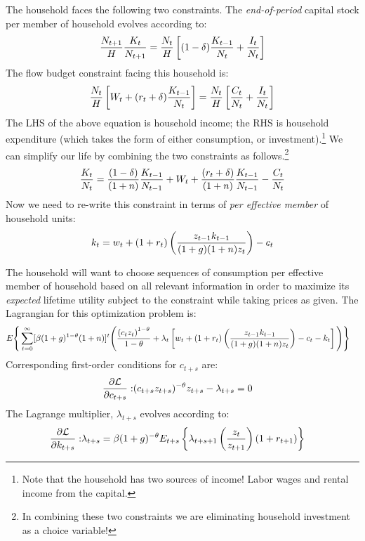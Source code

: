 \documentclass[11pt]{article}
\begin{document}
The household faces the following two constraints.  The \textit{end-of-period} capital stock per member of household evolves according to:
	\begin{equation}\label{eq:motionCapital}
		\frac{N_{t+1}}{H}\frac{K_t}{N_{t+1}} = \frac{N_t}{H}\left[(1 - \delta)\frac{K_{t-1}}{N_t} + \frac{I_{t}}{N_t}\right] \notag
	\end{equation}
The flow budget constraint facing this household is:
	\begin{equation}\label{eq:HHflowBudgetConstraint}
		\frac{N_{t}}{H}\left[W_{t} + (r_{t} + \delta)\frac{K_{t-1}}{N_t}\right] = \frac{N_{t}}{H}\left[\frac{C_{t}}{N_{t}} + \frac{I_{t}}{N_{t}}\right] \notag 
	\end{equation}
The LHS of the above equation is household income; the RHS is household expenditure (which takes the form of either consumption, or investment).\footnote{Note that the household has two sources of income! Labor wages and rental income from the capital.} We can simplify our life by combining the two constraints as follows.\footnote{In combining these two constraints we are eliminating household investment as a choice variable!}
	\begin{equation}
		\frac{K_t}{N_t} = \frac{(1 - \delta)}{(1 + n)}\frac{K_{t-1}}{N_{t-1}} + W_{t} + \frac{(r_{t} + \delta)}{(1+n)}\frac{K_{t-1}}{N_{t-1}} -  \frac{C_{t}}{N_{t}}\notag
	\end{equation}
Now we need to re-write this constraint in terms of \textit{per effective member} of household units:
	\begin{align}
		k_t= w_t + (1 + r_t)\left(\frac{z_{t-1}k_{t-1}}{(1 + g)(1 + n)z_t}\right) - c_t\notag
	\end{align}
	
The household will want to choose sequences of  consumption per effective member of household based on all relevant information in order to maximize its \textit{expected} lifetime utility subject to the constraint while taking prices as given.  The Lagrangian for this optimization problem is:
	\begin{align}
		&E\Bigg\{\sum_{t=0}^{\infty} [\beta(1+g)^{1-\theta}(1+n)]^t\Bigg(\frac{\left(c_t z_t\right)^{1-\theta}}{1-\theta} + \lambda_{t} \left[w_t + (1 + r_t)\left(\frac{z_{t-1}k_{t-1}}{(1 + g)(1 + n)z_t}\right) - c_t - k_t\right]\Bigg)\Bigg\} \notag
	\end{align}
Corresponding first-order conditions for $c_{t+s}$ are:
	\begin{align}
		\frac{\partial \mathcal{L}}{\partial c_{t+s}}:& (c_{t+s}z_{t+s})^{-\theta}z_{t+s} - \lambda_{t+s} = 0 \notag 
	\end{align}
The Lagrange multiplier, $\lambda_{t+s}$ evolves according to:
	\begin{align}
		\frac{\partial \mathcal{L}}{\partial k_{t+s}}:& \lambda_{t+s} = \beta(1+g)^{-\theta} E_{t+s}\left\{\lambda_{t+s+1}\left(\frac{z_t}{z_{t+1}}\right)(1 + r_{t+1})\right\} \notag
	\end{align}
\end{document}
